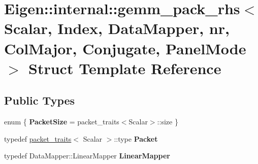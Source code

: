 \hypertarget{struct_eigen_1_1internal_1_1gemm__pack__rhs_3_01_scalar_00_01_index_00_01_data_mapper_00_01nr_00e5afdbaca90e394aa6e3c7b4d02529b6}{}\section{Eigen\+::internal\+::gemm\+\_\+pack\+\_\+rhs$<$ Scalar, Index, Data\+Mapper, nr, Col\+Major, Conjugate, Panel\+Mode $>$ Struct Template Reference}
\label{struct_eigen_1_1internal_1_1gemm__pack__rhs_3_01_scalar_00_01_index_00_01_data_mapper_00_01nr_00e5afdbaca90e394aa6e3c7b4d02529b6}
\subsection*{Public Types}
\begin{DoxyCompactItemize}
\item 
\mbox{\label{struct_eigen_1_1internal_1_1gemm__pack__rhs_3_01_scalar_00_01_index_00_01_data_mapper_00_01nr_00e5afdbaca90e394aa6e3c7b4d02529b6_a93150a0211e4c418dc90b0b4cf3b1c2a}} 
enum \{ {\bfseries Packet\+Size} = packet\+\_\+traits$<$Scalar$>$\+::size
 \}
\item 
\mbox{\label{struct_eigen_1_1internal_1_1gemm__pack__rhs_3_01_scalar_00_01_index_00_01_data_mapper_00_01nr_00e5afdbaca90e394aa6e3c7b4d02529b6_aadc963b20fd13acc2dc5831c2fc40a97}} 
typedef \mbox{\hyperlink{struct_eigen_1_1internal_1_1packet__traits}{packet\+\_\+traits}}$<$ Scalar $>$\+::type {\bfseries Packet}
\item 
\mbox{\label{struct_eigen_1_1internal_1_1gemm__pack__rhs_3_01_scalar_00_01_index_00_01_data_mapper_00_01nr_00e5afdbaca90e394aa6e3c7b4d02529b6_a2b1b83935a24f8fb9eeefe131ea9a670}} 
typedef Data\+Mapper\+::\+Linear\+Mapper {\bfseries Linear\+Mapper}
\end{DoxyCompactItemize}
